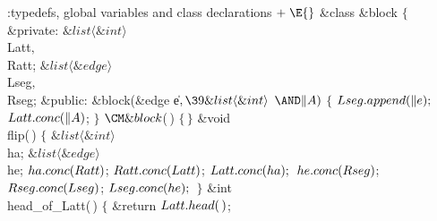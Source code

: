 \Y\B\4:typedefs, global variables and class declarations\X${}\mathrel+\E{}$%
\6
\&{class} \&{block} ${}\{{}$\1\6
\4\&{private}:\5
${}\&{list}\langle\&{int}\rangle{}$ \\{Latt}${},{}$ \\{Ratt};\6
${}\&{list}\langle\&{edge}\rangle{}$ \\{Lseg}${},{}$ \\{Rseg};\7
\4\&{public}:\5
\&{block}(\&{edge} \|e${},\39\&{list}\langle\&{int}\rangle{}$ ${}{\AND}\|A){}$%
\1\1\2\2\6
${}\{{}$\1\6
${}\\{Lseg}.\\{append}(\|e);{}$\6
${}\\{Latt}.\\{conc}(\|A){}$;\6
\4${}\}{}$\2\7
${}\CM\&{block}{}$(\,)\5
${}\{\,\}{}$\7
\&{void} \\{flip}(\,)\1\1\2\2\6
${}\{{}$\1\6
${}\&{list}\langle\&{int}\rangle{}$ \\{ha};\6
${}\&{list}\langle\&{edge}\rangle{}$ \\{he};\7
${}\\{ha}.\\{conc}(\\{Ratt}){}$;\5
${}\\{Ratt}.\\{conc}(\\{Latt}){}$;\5
${}\\{Latt}.\\{conc}(\\{ha});{}$\6
${}\\{he}.\\{conc}(\\{Rseg}){}$;\5
${}\\{Rseg}.\\{conc}(\\{Lseg}){}$;\5
${}\\{Lseg}.\\{conc}(\\{he});{}$\6
\4${}\}{}$\2\7
\&{int} \\{head\_of\_Latt}(\,)\5
${}\{{}$\5
\1\&{return} ${}\\{Latt}.\\{head}(\,){}$;\5

